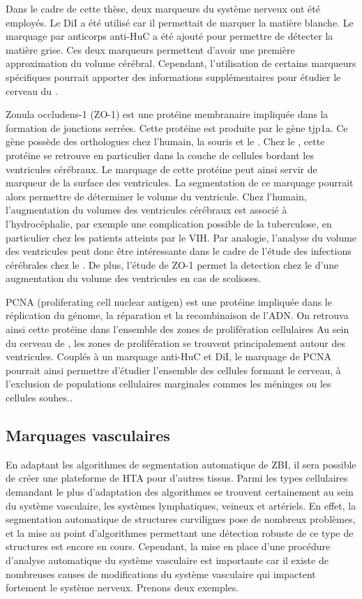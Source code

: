 \documentclass[\main/main.tex]{subfiles}
\begin{document}
%
Dans le cadre de cette thèse, deux marqueurs du système nerveux ont été employés.
%
Le DiI a été utilisé car il permettait de marquer la matière blanche.
%
Le marquage par anticorps anti-HuC a été ajouté pour permettre de détecter la matière grise.
%
Ces deux marqueurs permettent d'avoir une première approximation du volume cérébral.
%
Cependant, l'utilisation de certains marqueurs spécifiques pourrait apporter des informations supplémentaires pour étudier le cerveau du \pz{}.

%
Zonula occludens-1 (ZO-1) est une protéine membranaire impliquée dans la formation de jonctions serrées.
%
Cette protéine est produite par le gène tjp1a.
%
Ce gène possède des orthologues chez l'humain, la souris et le \pz{}.
%
Chez le \pz{}, cette protéine se retrouve en particulier dans la couche de cellules bordant les ventricules cérébraux.
%
Le marquage de cette protéine peut ainsi servir de marqueur de la surface des ventricules.
%
La segmentation de ce marquage pourrait alors permettre de déterminer le volume du ventricule.
%
Chez l'humain, l'augmentation du volumes des ventricules cérébraux est associé à l'hydrocéphalie, par exemple une complication possible de la tuberculose, en particulier chez les patients atteints par le VIH.
%
Par analogie, l'analyse du volume des ventricules peut donc être intéressante dans le cadre de l'étude des infections cérébrales chez le \pz{}.
%
De plus, l'étude de ZO-1 permet la detection chez le \pz{} d'une augmentation du volume des ventricules en cas de scolioses\cite{vesque_2019}.

PCNA (proliferating cell nuclear antigen) est une protéine impliquée dans le réplication du génome, la réparation et la recombinaison de l'ADN.
%
On retrouva ainsi cette protéine dans l'ensemble des zones de prolifération cellulaires
%
Au sein du cerveau de \pz{}, les zones de prolifération se trouvent principalement autour des ventricules.
%
Couplés à un marquage anti-HuC et DiI, le marquage de PCNA pourrait ainsi permettre d'étudier l'ensemble des cellules formant le cerveau, à l'exclusion de populations cellulaires marginales commes les méninges ou les cellules souhes..

    \subsection{\label{chap:bio:marqueurs:vasc} Marquages vasculaires}

%
En adaptant les algorithmes de segmentation automatique de ZBI,
il sera possible de créer une plateforme de HTA pour d'autres tissus.
Parmi les types cellulaires demandant le plus d'adaptation des algorithmes se trouvent certainement au sein du système vasculaire, les systèmes lymphatiques, veineux et artériels.
%
En effet,
la segmentation automatique de structures curvilignes pose de nombreux problèmes,
et la mise au point d'algorithmes permettant une détection robuste de ce type de
structures est encore en cours\cite{merveille_2019,mosinska_2020,mou_2019}.
%
Cependant, la mise en place d'une procédure d'analyse automatique du système vasculaire est importante car il existe de nombreuses causes de modifications du système vasculaire qui impactent fortement le système nerveux.
%
Prenons deux exemples.
\end{document}
